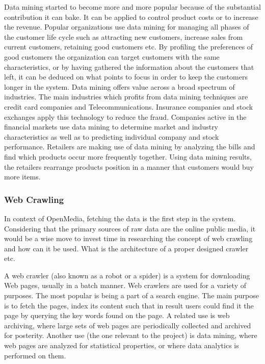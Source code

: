Data mining started to become more and more popular because of the substantial contribution it can bake. It can be applied to control product costs or to increase the revenue. Popular organizations use data mining for managing all phases of the customer life cycle such as attracting new customers, increase sales from current customers, retaining good customers etc.
By profiling the preferences of good customers the organization can target customers with the same characteristics, or by having gathered the information about the customers that left, it can be deduced on what points to focus in order to keep the customers longer in the system. Data mining offers value across a broad spectrum of industries. The main industries which profits from data mining techniques are credit card companies and Telecommunications. Insurance companies and stock exchanges apply this technology to reduce the fraud. Companies active in the financial markets use data mining to determine market and industry characteristics as well as to predicting individual company and stock performance. Retailers are making use of data mining by analyzing the bills and find which products occur more frequently together. Using data mining results, the retailers rearrange products position in a manner that customers would buy more items.

\subsubsection{Web Crawling}
In context of OpenMedia, fetching the data is the first step in the system. Considering that the primary sources of raw data are the online public media, it would be a wise move to invest time in researching the concept of web crawling and how can it be used. What is the architecture of a proper designed crawler etc.

A web crawler (also known as a robot or a spider) is a system for downloading Web pages, usually in a batch manner. Web crawlers are used for a variety of
purposes. The most popular is being a part of a search engine. The main purpose is to fetch the pages, index its content such that in result users could find it the page by querying the key words found on the page. A related use is web archiving, where large sets of web pages are periodically collected and archived for posterity. Another use (the one relevant to the project) is data mining, where web pages are analyzed for statistical properties, or where data analytics is performed on them.

